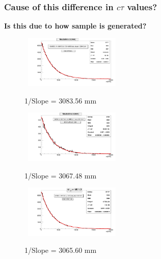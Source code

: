 \documentclass{beamer}
\begin{document}
\begin{frame}
\frametitle{Cause of this difference in $c\tau$ values?}
\begin{LARGE}
\textbf{Is this due to how sample is generated?}
\end{LARGE}
\vspace{-0.3cm}
\begin{figure}[ht]
\begin{minipage}[b]{0.45\linewidth}
\centering
\mbox{
\includegraphics[height=2.5cm, width=\textwidth]{MC_TimeDL.png}}
\vspace{-1cm}
\caption{1/Slope = 3083.56 mm }
\label{fig:OffFrom_MC}
\end{minipage}
\hspace{0.1cm}
\begin{minipage}[b]{0.45\linewidth}
\centering
\mbox{
\includegraphics[height=2.5cm,width=\textwidth]{Priv_MC_TimeDL.png}}
\vspace{-1cm}
\caption{1/Slope = 3067.48 mm }
\label{fig:Priv_MCTime}
\end{minipage}
\end{figure}
\vspace{-1.0cm}
\begin{figure}[ht]
\begin{minipage}[b]{0.45\linewidth}
\centering
\mbox{
\includegraphics[height=2.5cm, width=\textwidth]{Dist_TravDL.png}}
\vspace{-1cm}
\caption{1/Slope = 3065.60 mm }
\label{fig:Off_DL}
\end{minipage}
\hspace{0.1cm}
\begin{minipage}[b]{0.45\linewidth}

\end{minipage}
\end{figure}
\end{frame}
\end{document}
